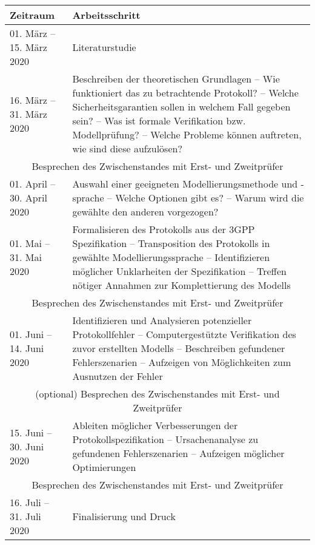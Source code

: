 \begin{table}[ht!]
\centering
\begin{tabular}{p{}|p{}}
\textbf{Zeitraum} & \textbf{Arbeitsschritt}\\\hline
01. März -- 15. März 2020 & Literaturstudie\\\hline
16. März -- 31. März 2020 & Beschreiben der theoretischen Grundlagen\newline
-- Wie funktioniert das zu betrachtende Protokoll?\newline
-- Welche Sicherheitsgarantien sollen in welchem Fall gegeben sein?\newline
-- Was ist formale Verifikation bzw. Modellprüfung?\newline
-- Welche Probleme können auftreten, wie sind diese aufzulösen?\\\hline\hline
\multicolumn{2}{c}{Besprechen des Zwischenstandes mit Erst- und Zweitprüfer}\\\hline\hline
01. April -- 30. April 2020 & Auswahl einer geeigneten Modellierungsmethode und -sprache\newline
-- Welche Optionen gibt es?\newline
-- Warum wird die gewählte den anderen vorgezogen?\\\hline
01. Mai -- 31. Mai 2020 & Formalisieren des Protokolls aus der 3GPP Spezifikation\newline
-- Transposition des Protokolls in gewählte Modellierungssprache\newline
-- Identifizieren möglicher Unklarheiten der Spezifikation\newline
-- Treffen nötiger Annahmen zur Komplettierung des Modells\\\hline\hline
\multicolumn{2}{c}{Besprechen des Zwischenstandes mit Erst- und Zweitprüfer}\\\hline\hline
01. Juni -- 14. Juni 2020 & Identifizieren und Analysieren potenzieller Protokollfehler\newline
-- Computergestützte Verifikation des zuvor erstellten Modells\newline
-- Beschreiben gefundener Fehlerszenarien\newline
-- Aufzeigen von Möglichkeiten zum Ausnutzen der Fehler\\\hline\hline
\multicolumn{2}{c}{(optional) Besprechen des Zwischenstandes mit Erst- und Zweitprüfer}\\\hline\hline
15. Juni -- 30. Juni 2020 & Ableiten möglicher Verbesserungen der Protokollspezifikation\newline
-- Ursachenanalyse zu gefundenen Fehlerszenarien\newline
-- Aufzeigen möglicher Optimierungen\\\hline\hline
\multicolumn{2}{c}{Besprechen des Zwischenstandes mit Erst- und Zweitprüfer}\\\hline\hline
16. Juli -- 31. Juli 2020 & Finalisierung und Druck
\end{tabular}
\end{table}
